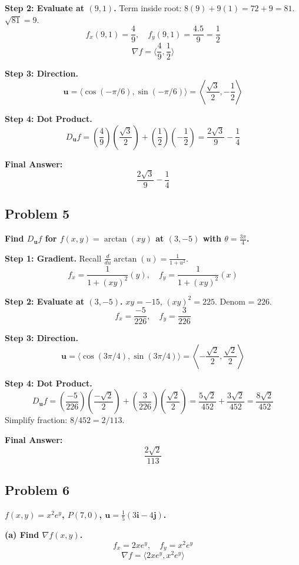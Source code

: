 \documentclass{article}
\begin{document}
\textbf{Step 2: Evaluate at $(9, 1)$.}
Term inside root: $8(9) + 9(1) = 72 + 9 = 81$. $\sqrt{81} = 9$.
\[ f_x(9, 1) = \frac{4}{9}, \quad f_y(9, 1) = \frac{4.5}{9} = \frac{1}{2} \]
\[ \nabla f = \langle \frac{4}{9}, \frac{1}{2} \rangle \]

\textbf{Step 3: Direction.}
\[ \mathbf{u} = \langle \cos(-\pi/6), \sin(-\pi/6) \rangle = \left\langle \frac{\sqrt{3}}{2}, -\frac{1}{2} \right\rangle \]

\textbf{Step 4: Dot Product.}
\[ D_{\mathbf{u}}f = \left(\frac{4}{9}\right)\left(\frac{\sqrt{3}}{2}\right) + \left(\frac{1}{2}\right)\left(-\frac{1}{2}\right) = \frac{2\sqrt{3}}{9} - \frac{1}{4} \]

\textbf{Final Answer:}
\[ \boxed{\frac{2\sqrt{3}}{9} - \frac{1}{4}} \]

\hrulefill

\subsection*{Problem 5}
\textbf{Find $D_{\mathbf{u}}f$ for $f(x, y) = \arctan(xy)$ at $(3, -5)$ with $\theta = \frac{3\pi}{4}$.}

\textbf{Step 1: Gradient.}
Recall $\frac{d}{du}\arctan(u) = \frac{1}{1+u^2}$.
\[ f_x = \frac{1}{1+(xy)^2}(y), \quad f_y = \frac{1}{1+(xy)^2}(x) \]

\textbf{Step 2: Evaluate at $(3, -5)$.}
$xy = -15$, $(xy)^2 = 225$. Denom = $226$.
\[ f_x = \frac{-5}{226}, \quad f_y = \frac{3}{226} \]

\textbf{Step 3: Direction.}
\[ \mathbf{u} = \langle \cos(3\pi/4), \sin(3\pi/4) \rangle = \left\langle -\frac{\sqrt{2}}{2}, \frac{\sqrt{2}}{2} \right\rangle \]

\textbf{Step 4: Dot Product.}
\[ D_{\mathbf{u}}f = \left(\frac{-5}{226}\right)\left(\frac{-\sqrt{2}}{2}\right) + \left(\frac{3}{226}\right)\left(\frac{\sqrt{2}}{2}\right) = \frac{5\sqrt{2}}{452} + \frac{3\sqrt{2}}{452} = \frac{8\sqrt{2}}{452} \]
Simplify fraction: $8/452 = 2/113$.

\textbf{Final Answer:}
\[ \boxed{\frac{2\sqrt{2}}{113}} \]

\hrulefill

\subsection*{Problem 6}
\textbf{$f(x, y) = x^2 e^y$, $P(7, 0)$, $\mathbf{u} = \frac{1}{5}(3\mathbf{i} - 4\mathbf{j})$.}

\textbf{(a) Find $\nabla f(x, y)$.}
\[ f_x = 2x e^y, \quad f_y = x^2 e^y \]
\[ \nabla f = \langle 2x e^y, x^2 e^y \rangle \]
\end{document}

